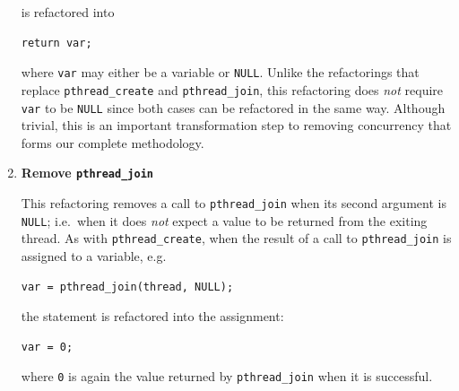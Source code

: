 \begin{enumerate}
\noindent
is refactored into

\begin{lstlisting}[frame=single]
return var;
\end{lstlisting}

\noindent
where \lstinline|var| may either be a variable or \lstinline|NULL|. Unlike the refactorings that replace \lstinline|pthread_create| and \lstinline|pthread_join|, this refactoring does \emph{not} require \lstinline|var| to be \lstinline|NULL| since both cases can be refactored in the same way. Although trivial, this is an important transformation step to removing concurrency that forms our complete methodology.




\item \textbf{Remove \lstinline|pthread_join|}

This refactoring removes a call to \lstinline|pthread_join| when its second argument is \lstinline|NULL|; i.e.\ when it does \emph{not} expect a value to be returned from the exiting thread. As with \lstinline|pthread_create|, when the result of a call to \lstinline|pthread_join| is assigned to a variable, e.g.\

\begin{lstlisting}[frame=single]
var = pthread_join(thread, NULL);
\end{lstlisting}

\noindent
the statement is refactored into the assignment:

\begin{lstlisting}[frame=single]
var = 0;
\end{lstlisting}

\noindent
where \lstinline|0| is again the value returned by \lstinline|pthread_join| when it is successful. 


\end{enumerate}

